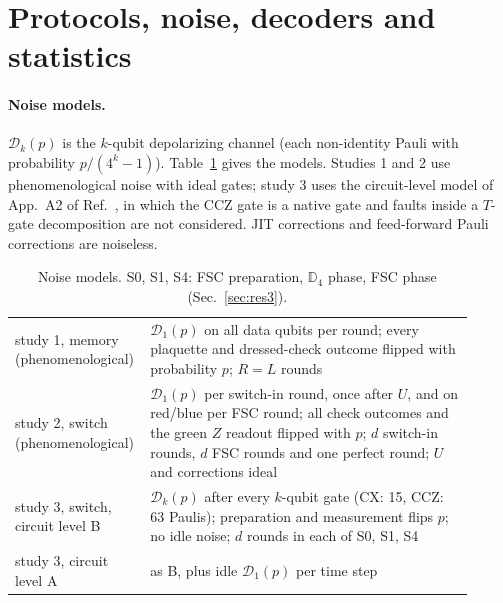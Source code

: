 \documentclass[a4paper]{article}
\begin{document}
\section{Protocols, noise, decoders and statistics}
\label{sec:setup}

\paragraph{Noise models.}
$\mathcal D_k(p)$ is the $k$-qubit depolarizing channel (each non-identity Pauli with probability $p/(4^k-1)$). Table~\ref{tab:noise} gives the models. Studies 1 and 2 use phenomenological noise with ideal gates; study 3 uses the circuit-level model of App.~A2 of Ref.~\cite{takada2026exact}, in which the CCZ gate is a native gate and faults inside a $T$-gate decomposition are not considered. JIT corrections and feed-forward Pauli corrections are noiseless.

\begin{table}[t]
\centering
\caption{Noise models. S0, S1, S4: FSC preparation, $\mathbb{D}_4$ phase, FSC phase (Sec.~\ref{sec:res3}).}
\label{tab:noise}
\small
\renewcommand{\arraystretch}{1.1}
\begin{tabular}{p{0.22\linewidth}p{0.69\linewidth}}
\toprule
study 1, memory (phenomenological) & $\mathcal D_1(p)$ on all data qubits per round; every plaquette and dressed-check outcome flipped with probability $p$; $R=L$ rounds \\
study 2, switch (phenomenological) & $\mathcal D_1(p)$ per switch-in round, once after $U$, and on red/blue per FSC round; all check outcomes and the green $Z$ readout flipped with $p$; $d$ switch-in rounds, $d$ FSC rounds and one perfect round; $U$ and corrections ideal \\
study 3, switch, circuit level B & $\mathcal D_k(p)$ after every $k$-qubit gate (CX: 15, CCZ: 63 Paulis); preparation and measurement flips $p$; no idle noise; $d$ rounds in each of S0, S1, S4 \\
study 3, circuit level A & as B, plus idle $\mathcal D_1(p)$ per time step \\
\bottomrule
\end{tabular}
\end{table}
\end{document}
